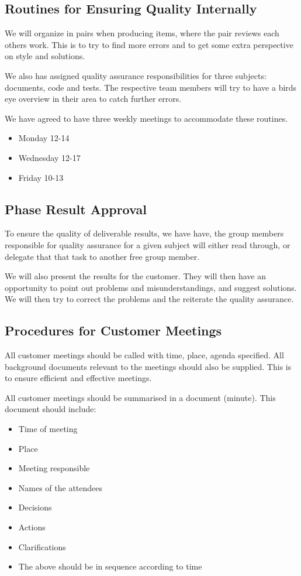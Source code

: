 \subsection{Routines for Ensuring Quality Internally}
We will organize in pairs when producing items, where the pair reviews each others work. This is to try to find more errors and to get some extra perspective on style and solutions.

We also has assigned quality assurance responsibilities for three subjects: documents, code and tests. The respective team members will try to have a birds eye overview in their area to catch further errors.

We have agreed to have three weekly meetings to accommodate these routines.
\begin{itemize}
	\item Monday 12-14
	\item Wednesday 12-17
	\item Friday 10-13
\end{itemize}

\subsection{Phase Result Approval}
To ensure the quality of deliverable results, we have have, the group members responsible for quality assurance for a given subject will either read through, or delegate that that task to another free group member.

We will also present the results for the customer. They will then have an opportunity to point out problems and misunderstandings, and suggest solutions. We will then try to correct the problems and the reiterate the quality assurance.

\subsection{Procedures for Customer Meetings}
All customer meetings should be called with time, place, agenda specified. All background documents relevant to the meetings should also be supplied. This is to ensure efficient and effective meetings.

All customer meetings should be summarised in a document (minute). This document should include:
\begin{itemize}
	\item Time of meeting
	\item Place
	\item Meeting responsible
	\item Names of the attendees
	\item Decisions
	\item Actions
	\item Clarifications
	\item The above should be in sequence according to time
\end{itemize}

